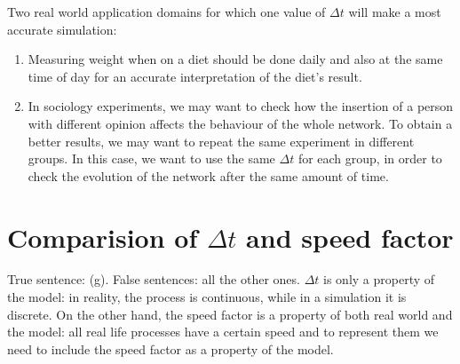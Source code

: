 \documentclass[a4paper]{article}
\begin{document}
Two real world application domains for which one value of $\Delta t$ will make a most accurate simulation:
\begin{enumerate}
\item Measuring weight when on a diet should be done daily and also at the same time of day for an accurate interpretation of the diet's result. 

\item In sociology experiments, we may want to check how the insertion of a person with different opinion affects the behaviour of the whole network. To obtain a better results, we may want to repeat the same experiment in different groups. In this case, we want to use the same $\Delta t$ for each group, in order to check the evolution of the network after the same amount of time.
\end{enumerate}

\section{Comparision of $\Delta t$ and speed factor}

True sentence: (g). False sentences: all the other ones.
$\Delta t$ is only a property of the model: in reality, the process is continuous, while in a simulation it is discrete. On the other hand, the speed factor is a property of both real world and the model: all real life processes have a certain speed and to represent them we need to include the speed factor as a property of the model.
\end{document}
